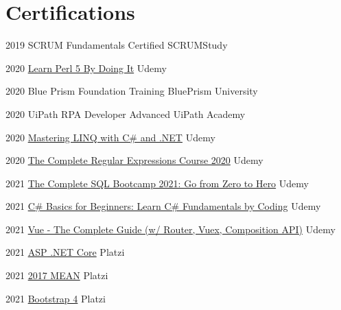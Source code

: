 \documentclass[letterpaper]{twentysecondcv} %
\begin{document}
\section{Certifications}
{
    \begin{twenty}
        
        \twentyitem
        {2019}
        {SCRUM Fundamentals Certified}
        {SCRUMStudy}
        {}
        
        \twentyitem
        {2020}
        {\href{http://ude.my/UC-8b854042-ac78-4c5b-a412-65ba63899017}
            {Learn Perl 5 By Doing It}
        }
        {Udemy}
        {}
    
        \twentyitem
        {2020}
        {Blue Prism Foundation Training}
        {BluePrism University}
        {}
        
        \twentyitem
        {2020}
        {UiPath RPA Developer Advanced}
        {UiPath Academy}
        {}
        
        \twentyitem
        {2020}
        {\href{http://ude.my/UC-cdbb0eb7-1152-42f4-883d-d267f2b7adf7}
            {Mastering LINQ with C\# and .NET}
        }
        {Udemy}
        {}
    
        \twentyitem
        {2020}
        {\href{http://ude.my/UC-c10e41d9-1c6f-44e5-9426-d4c40e385673}
            {The Complete Regular Expressions Course 2020}
        }
        {Udemy}
        {}
        
        \twentyitem
        {2021}
        {\href{http://ude.my/UC-a276cfba-5873-4f08-892b-ecd564b69cc7}
            {The Complete SQL Bootcamp 2021: Go from Zero to Hero}
        }
        {Udemy}
        {}
        
        \twentyitem
        {2021}
        {\href{http://ude.my/UC-d913aaf2-7f89-43bf-ab2d-a6d0192fd784}
            {C\# Basics for Beginners: Learn C\# Fundamentals by Coding}
        }
        {Udemy}
        {}
        
        \twentyitem
        {2021}
        {\href{http://ude.my/UC-6739b136-b8be-4568-ad89-7fd19bc0096d}
            {Vue - The Complete Guide (w/ Router, Vuex, Composition API)}}
        {Udemy}
        {}
        
        \twentyitem
        {2021}
        {\href{https://platzi.com/p/camurillo582/curso/1395-course/diploma/detalle}
            {ASP .NET Core}
        }
        {Platzi}
        {}
        
        \twentyitem
        {2021}
        {\href{https://platzi.com/p/camurillo582/curso/1182-mean-2017/diploma/detalle/}
            {2017 MEAN}
        }
        {Platzi}
        {}
        
        \twentyitem
        {2021}
        {\href{https://platzi.com/p/camurillo582/curso/1331-bootstrap/diploma/detalle/}
            {Bootstrap 4}
        }
        {Platzi}
        {}
        
\end{twenty}
}
\end{document}
